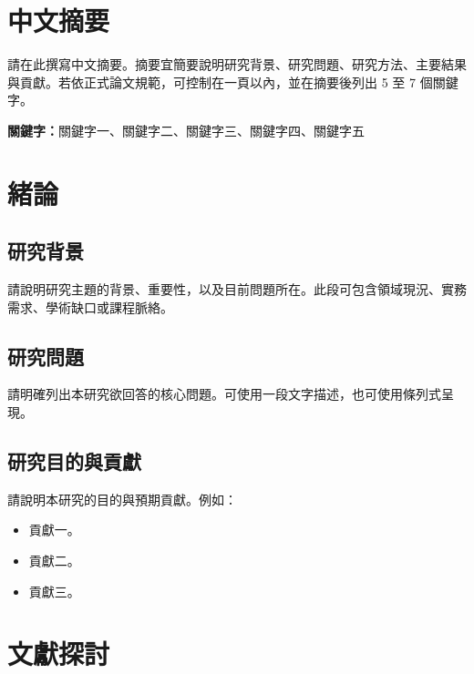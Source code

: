 \documentclass[12pt,a4paper]{article}
\begin{document}
\section*{\centering 中文摘要}
請在此撰寫中文摘要。摘要宜簡要說明研究背景、研究問題、研究方法、主要結果與貢獻。若依正式論文規範，可控制在一頁以內，並在摘要後列出 5 至 7 個關鍵字。

\noindent\textbf{關鍵字：}關鍵字一、關鍵字二、關鍵字三、關鍵字四、關鍵字五

\newpage
\tableofcontents

\newpage
{}
\listoffigures

\newpage
{}
\listoftables

\newpage
{}
\setcounter{page}{1}

\section{緒論}

\subsection{研究背景}
請說明研究主題的背景、重要性，以及目前問題所在。此段可包含領域現況、實務需求、學術缺口或課程脈絡。

\subsection{研究問題}
請明確列出本研究欲回答的核心問題。可使用一段文字描述，也可使用條列式呈現。

\subsection{研究目的與貢獻}
請說明本研究的目的與預期貢獻。例如：
\begin{itemize}
  \item 貢獻一。
  \item 貢獻二。
  \item 貢獻三。
\end{itemize}

\section{文獻探討}
\end{document}
